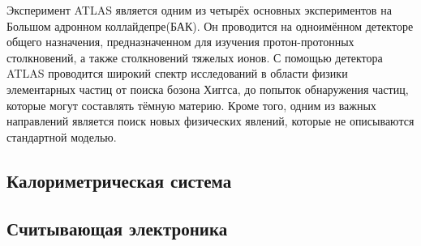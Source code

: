 Эксперимент ATLAS является одним из четырёх основных экспериментов на Большом адронном коллайдепре(БАК). Он проводится на одноимённом детекторе общего назначения, предназначенном для изучения протон-протонных столкновений, а также столкновений тяжелых ионов. С помощью детектора ATLAS проводится широкий спектр исследований в области физики элементарных частиц от поиска бозона Хиггса, до попыток обнаружения частиц, которые могут составлять тёмную материю. Кроме того, одним из важных направлений является поиск новых физических явлений, которые не описываются стандартной моделью.\par

\subsection{Калориметрическая система}

\subsection{Считывающая электроника}

